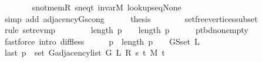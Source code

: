 \begin{isabellebody}
\ \ \ \ \ \ \isamarkupfalse%
\ s{\isacharunderscore}{\kern0pt}not{\isacharunderscore}{\kern0pt}mem{\isacharunderscore}{\kern0pt}R\ s{\isacharunderscore}{\kern0pt}neq{\isacharunderscore}{\kern0pt}t\ invar{\isacharunderscore}{\kern0pt}M\ lookup{\isacharunderscore}{\kern0pt}s{\isacharunderscore}{\kern0pt}eq{\isacharunderscore}{\kern0pt}None\isanewline
\ \ \ \ \ \ \isamarkupfalse%
\ {\isacharparenleft}{\kern0pt}simp\ add{\isacharcolon}{\kern0pt}\ adjacency{\isacharunderscore}{\kern0pt}G{}{\isacharunderscore}{\kern0pt}s{\isacharunderscore}{\kern0pt}cong{\isacharparenright}{\kern0pt}\isanewline
\ \ \ \ \isamarkupfalse%
\ {\isacharquery}{\kern0pt}thesis\isanewline
\ \ \ \ \ \ \isamarkupfalse%
\ set{\isacharunderscore}{\kern0pt}free{\isacharunderscore}{\kern0pt}vertices{\isacharunderscore}{\kern0pt}subset\isanewline
\ \ \ \ \ \ \isamarkupfalse%
\ {\isacharparenleft}{\kern0pt}rule\ set{\isacharunderscore}{\kern0pt}rev{\isacharunderscore}{\kern0pt}mp{\isacharparenright}{\kern0pt}\isanewline
\ \ \isamarkupfalse%
\isanewline
\ \ \isamarkupfalse%
\ \isamarkupfalse%
\ {\isachardoublequoteopen}length\ {\isacharquery}{\kern0pt}p\ {\isacharminus}{\kern0pt}\ {}\ {\isacharless}{\kern0pt}\ length\ {\isacharquery}{\kern0pt}p{\isachardoublequoteclose}\isanewline
\ \ \ \ \isamarkupfalse%
\ p{\isacharunderscore}{\kern0pt}tbd{\isacharunderscore}{\kern0pt}non{\isacharunderscore}{\kern0pt}empty\isanewline
\ \ \ \ \isamarkupfalse%
\ {\isacharparenleft}{\kern0pt}fastforce\ intro{\isacharcolon}{\kern0pt}\ diff{\isacharunderscore}{\kern0pt}less{\isacharparenright}{\kern0pt}\isanewline
\ \ \isamarkupfalse%
\ \isamarkupfalse%
\ {\isachardoublequoteopen}{\isacharquery}{\kern0pt}p\ {\isacharbang}{\kern0pt}\ {\isacharparenleft}{\kern0pt}length\ {\isacharquery}{\kern0pt}p\ {\isacharminus}{\kern0pt}\ {}{\isacharparenright}{\kern0pt}\ {\isasymnotin}\ G{\isachardot}{\kern0pt}S{\isachardot}{\kern0pt}set\ L{\isachardoublequoteclose}\isanewline
\ \ \isamarkupfalse%
\ {\isacharminus}{\kern0pt}\isanewline
\ \ \ \ \isamarkupfalse%
\ {\isachardoublequoteopen}last\ {\isacharquery}{\kern0pt}p\ {\isasymin}\ set\ {\isacharparenleft}{\kern0pt}G{\isachardot}{\kern0pt}adjacency{\isacharunderscore}{\kern0pt}list\ {\isacharparenleft}{\kern0pt}G{}\ L\ R\ s\ t\ M{\isacharparenright}{\kern0pt}\ t{\isacharparenright}{\kern0pt}{\isachardoublequoteclose}\isanewline

\end{isabellebody}
